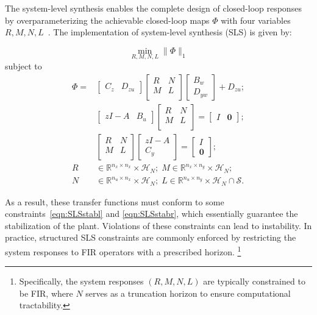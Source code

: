 The system-level synthesis enables the complete design of closed-loop responses by overparameterizing the achievable closed-loop maps \(\Phi\) with four variables \(R,M,N,L\)~\cite{wang2019SLS}. The implementation of system-level synthesis (SLS) is given by:
\begin{opt}\label{Prob:SLSsyn}
\[
\min_{R,M,N,L} \|\Phi\|_1
\]
subject to
\begin{subequations}
\begin{align}
\Phi = & \begin{bmatrix}
    C_z & D_{zu}
\end{bmatrix}
\begin{bmatrix}
    R & N\\
    M & L\\
\end{bmatrix}
\begin{bmatrix}
    B_w \\ D_{yw}
\end{bmatrix} + D_{zu}; \\ 
& \begin{bmatrix}
    z I - A & B_u
\end{bmatrix}
\begin{bmatrix}
    R & N\\
    M & L\\
\end{bmatrix} =
\begin{bmatrix}
    I & \mathbf{0}
\end{bmatrix}; \label{eqn:SLSstabl} \\ 
& \begin{bmatrix}
    R & N\\
    M & L\\
\end{bmatrix} \begin{bmatrix}
    z I - A \\ C_y
\end{bmatrix}=
\begin{bmatrix}
    I \\ \mathbf{0}
\end{bmatrix}; \label{eqn:SLSstabr} \\
R & \in \mathbb{R}^{n_x \times n_x} \times \mathcal{H}_N;\;
M \in \mathbb{R}^{n_x \times n_y} \times \mathcal{H}_N;\; \\
N & \in \mathbb{R}^{n_u \times n_x} \times \mathcal{H}_N;\;
L \in \mathbb{R}^{n_u \times n_y} \times \mathcal{H}_N \cap \mathcal{S}.
\end{align}
\end{subequations}
\end{opt}
As a result, these transfer functions must conform to some constraints~\eqref{eqn:SLSstabl} and \eqref{eqn:SLSstabr}, which essentially guarantee the stabilization of the plant.
Violations of these constraints can lead to instability. 
In practice, structured SLS constraints are commonly enforced by restricting the system responses to FIR operators with a prescribed horizon.
\footnote{Specifically, the system responses $(R,M,N,L)$ are typically constrained to be FIR, where $N$ serves as a truncation horizon to ensure computational tractability.}

